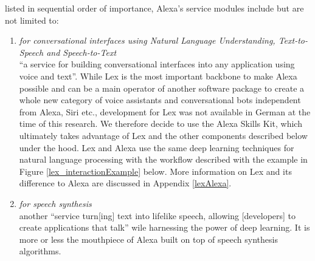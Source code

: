 listed in sequential order of importance, Alexa's service modules include but are not limited to: 

\begin{enumerate}

	\item[\href{https://aws.amazon.com/lex/}{\textbf{Lex}} \footnote{\url{https://aws.amazon.com/lex}}] \textit{for conversational interfaces using Natural Language Understanding, Text-to-Speech and Speech-to-Text} \\
	``a service for building conversational interfaces into any application using voice and text''\cite{aws_website}.
	While Lex is the most important backbone to make Alexa possible and can be a main operator of another software package to create a whole new category of voice assistants and conversational bots independent from Alexa, Siri etc., development for Lex was not available in German at the time of this research. We therefore decide to use the Alexa Skills Kit, which ultimately takes advantage of Lex and the other components described below under the hood. Lex and Alexa use the same deep learning techniques for natural language processing with the workflow described with the example in Figure \ref{lex_interactionExample} below. More information on Lex and its difference to Alexa are discussed in Appendix \ref{lexAlexa}.
%	
%
%

	
	
	\item[\href{https://aws.amazon.com/polly/}{\textbf{Polly}} \footnote{\url{https://aws.amazon.com/polly}}] \textit{for speech synthesis\\}
	another ``service turn[ing] text into lifelike speech, allowing [developers] to create applications that talk'' \cite{aws_website} wile harnessing the power of deep learning. It is more or less the mouthpiece of Alexa built on top of speech synthesis algorithms.
	
%	
	

\end{enumerate}
